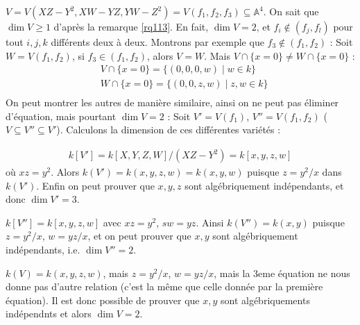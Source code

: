             \begin{expl}
                $V = V(XZ - Y^2 ,  XW - YZ, YW - Z^2) = V(f_1, f_2, f_3) \subseteq \mathbb{A}^4$. On sait que $\dim V \geq 1$ d'après la remarque \ref{rq113}. En fait, $\dim V = 2$, et $f_i \notin (f_j, f_l)$ pour tout $i,j,k$ différents deux à deux. Montrons par exemple que $f_3 \notin (f_1, f_2)$ : Soit $W = V(f_1, f_2)$, si $f_3 \in (f_1, f_2)$, alors $V = W$. Mais $V \cap \{x = 0\} \neq W \cap \{x = 0\}$ :
                \begin{align*}
                    &V \cap \{x = 0\} = \{(0,0,0,w) \mid w \in k\} \\
                    &W \cap \{x = 0\} = \{(0,0,z,w) \mid z,w \in k\} \\
                \end{align*}
                On peut montrer les autres de manière similaire, ainsi on ne peut pas éliminer d'équation, mais pourtant $\dim V = 2$ : Soit $V' = V(f_1)$, $V'' = V(f_1, f_2)$ ($V \subseteq V'' \subseteq V'$). Calculons la dimension de ces différentes variétés :
                \item 
                \begin{align*}
                    k[V'] = k[X,Y,Z,W]/(XZ - Y^2) = k[x,y,z,w]
                \end{align*}
                où $xz = y^2$. Alors $k(V') = k(x,y,z,w) = k(x,y,w)$ puisque $z = y^2/x$ dans $k(V')$. Enfin on peut prouver que $x,y,z$ sont algébriquement indépendants, et donc $\dim V' = 3$. 
                \item $k[V''] = k[x,y,z,w]$ avec $xz = y^2$, $sw = yz$. Ainsi $k(V'') = k(x,y)$ puisque $z = y^2/x$, $w = yz/x$, et on peut prouver que $x,y$ sont algébriquement indépendants, i.e. $\dim V'' = 2$. 
                \item $k(V) = k(x,y,z,w)$, mais $z = y^2/x$, $w = yz/x$, mais la $3$eme équation ne nous donne pas d'autre relation (c'est la même que celle donnée par la première équation). Il est donc possible de prouver que $x,y$ sont algébriquements indépendnts et alors $\dim V = 2$.
            \end{expl}

